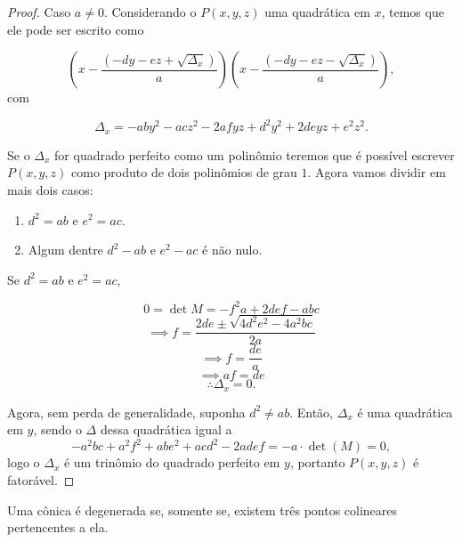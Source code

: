 \begin{proof}
Caso $a \ne 0$.
Considerando o $P(x,y,z)$ uma quadrática em $x$, temos que ele pode ser escrito como

\[ \left(x - \frac{(-dy - ez + \sqrt{\Delta_x})}{a}\right)\left(x - \frac{(-dy - ez - \sqrt{\Delta_x})}{a}\right),\]
com 

\[\Delta_x =-aby^2 - acz^2 - 2afyz + d^2y^2 + 2deyz + e^2z^2.\]

Se o $\Delta_x$ for quadrado perfeito como um polinômio teremos que é possível escrever $P(x,y,z)$ como produto de dois polinômios de grau $1$. Agora vamos dividir em mais dois casos:

\begin{enumerate}
    \item $d^2 = ab$ e $e^2 = ac$.
    \item Algum dentre $d^2 - ab$ e $e^2 - ac$ é não nulo. 
\end{enumerate}
Se $d^2 = ab$ e $e^2 = ac$, 

\[0 = \det M = -f^2a + 2def - abc\]
\[\implies f = \dfrac{2de\pm \sqrt{4d^2e^2-4a^2bc}}{2a}\]
\[\implies f = \dfrac{de}{a}\]
\[\implies af = de\]
\[\therefore \Delta_x = 0.\]

Agora, sem perda de generalidade, suponha $d^2\ne ab$. Então, $\Delta_x$ é uma quadrática em $y$, sendo o $\Delta$ dessa quadrática igual a 
\[-a^2bc + a^2f^2 + abe^2 + acd^2 - 2adef = -a\cdot\det(M) = 0,\]
logo o $\Delta_x $ é um trinômio do quadrado perfeito em $y$, portanto $P(x,y,z)$ é fatorável.
\end{proof}

\begin{thm}
Uma cônica é degenerada se, somente se, existem três pontos colineares pertencentes a ela.
\end{thm}

